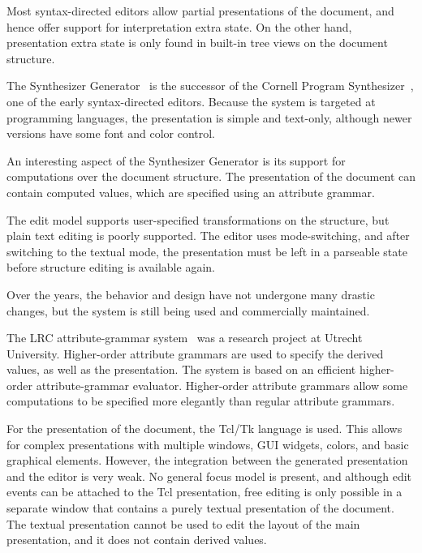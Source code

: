 Most syntax-directed editors allow partial presentations of the document, and hence offer support for interpretation extra state. On the other hand, presentation extra state is only found in built-in tree views on the document structure.


The Synthesizer Generator~\cite{reps84synGen} is the successor of the Cornell Program Synthesizer~\cite{teitelbaum81progSynth}, one of the early syntax-directed editors. Because the system is targeted at programming languages, the presentation is simple and text-only, although newer versions have some font and color control. 


An interesting aspect of the Synthesizer Generator is its support for computations over the document structure. The presentation of the document can contain computed values, which are specified using an attribute grammar. 

The edit model supports user-specified transformations on the structure, but plain text editing is poorly supported. The editor uses mode-switching, and after switching to the textual mode, the presentation must be left in a parseable state before structure editing is available again.

Over the years, the behavior and design have not undergone many drastic changes, but the system is still being used and commercially maintained.


The LRC attribute-grammar system~\cite{saraiva00lrc} was a research project at Utrecht University. Higher-order attribute grammars are used to specify the derived values, as well as the presentation. The system is based on an efficient higher-order attribute-grammar evaluator. Higher-order attribute grammars allow some computations to be specified more elegantly than regular attribute grammars.

For the presentation of the document, the Tcl/Tk language is used. This allows for complex presentations with multiple windows, GUI widgets, colors, and basic graphical elements. However, the integration between the generated presentation and the editor is very weak. No general focus model is present, and although edit events can be attached to the Tcl presentation, free editing is only possible in a separate window that contains a purely textual presentation of the document. The textual presentation cannot be used to edit the layout of the main presentation, and it does not contain derived values. 

